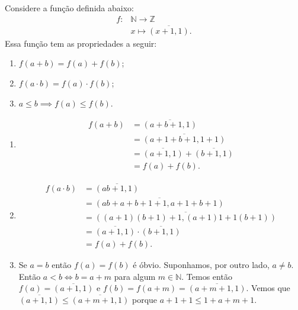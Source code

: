 \documentclass[../main.tex]{subfiles}
\begin{document}
\begin{teo}\label{int-teo-imersao}
    Considere a função definida abaixo:
    \begin{align*}
        f \colon &\mathbb{N} \to \mathbb{Z} \\
        &x \mapsto \overline{(x+1, 1)}.
    \end{align*}
    Essa função tem as propriedades a seguir:
    \begin{enumerate}[label=(\roman*)]
        \item $f(a + b) = f(a) + f(b)$;
        \item $f(a \cdot b) = f(a) \cdot f(b)$;
        \item $a \leq b \implies f(a) \leq f(b)$.
    \end{enumerate}
\end{teo}
\begin{dem}
    \begin{enumerate}[label=(\roman*)]
        \item 
            \begin{align*}
                f(a + b) 
                &= \overline{(a+b+1, 1)} \\
                &= \overline{(a+1+b+1, 1+1)}  \\
                &= \overline{(a+1,1)} + \overline{(b+1,1)} \\
                &= f(a) + f(b).
            \end{align*}
        
        \item 
        \begin{align*}
            f(a \cdot b) &= \overline{(ab+1, 1)}\\
                        &= \overline{(ab+a+b+1+1, a+1+b+1)}\\
                        &= \overline{((a+1)(b+1)+1, (a+1)1 + 1(b+1))}\\
                        &= \overline{(a+1,1)} \cdot \overline{(b+1,1)}\\
                        &= f(a) + f(b).
        \end{align*}        
        
        \item 
        Se $a=b$ então $f(a)=f(b)$ é óbvio. Suponhamos, por outro lado, $a \neq b$.
        Então $a<b \iff b=a+m$ para algum $m \in \mathbb{N}$.
        Temos então $f(a) = \overline{(a+1,1)}$ e $f(b) = f(a+m) = \overline{(a+m+1,1)}$.
        Vemos que $\overline{(a+1,1)} \leq \overline{(a+m+1,1)}$ porque $a+1+1 \leq 1 + a + m + 1$.
    \end{enumerate}
\end{dem}
\end{document}
